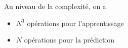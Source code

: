 Au niveau de la complexité, on a 

\begin{itemize}
	\item $N^3$ opérations pour l'apprentissage
	\item $N$ opérations pour la prédiction
\end{itemize}

	


% 
		
		
